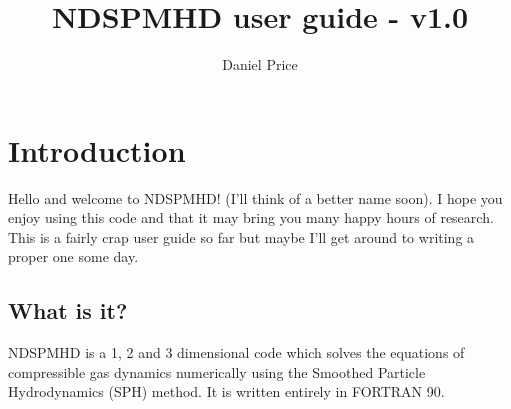 \documentclass[a4paper,12pt]{article}
\title{NDSPMHD user guide - v1.0}
\author{Daniel Price}
\begin{document}
\maketitle
\tableofcontents

\section{Introduction}
 Hello and welcome to NDSPMHD! (I'll think of a better name soon). I hope you
enjoy using this code and that it may bring you many happy hours of research.
This is a fairly crap user guide so far but maybe I'll get around to writing a
proper one some day. 

\subsection{What is it?}
NDSPMHD is a 1, 2 and 3 dimensional code which solves the equations of
compressible gas
dynamics numerically using the Smoothed Particle Hydrodynamics (SPH) method. It
is written entirely in FORTRAN 90.
\end{document}
